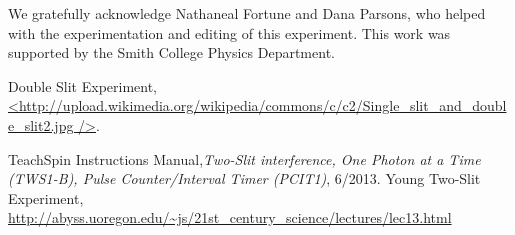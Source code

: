 \documentclass[prb,preprint]{revtex4-1}
\begin{document}
\begin{acknowledgments}

We gratefully acknowledge Nathaneal Fortune and Dana Parsons, who helped with the experimentation and editing of this experiment.  This work was supported by the Smith College Physics Department.

\end{acknowledgments}


\begin{thebibliography}{99}

 Double Slit Experiment, \url{<http://upload.wikimedia.org/wikipedia/commons/c/c2/Single_slit_and_double_slit2.jpg
/>}.

 TeachSpin Instructions Manual,\textit{Two-Slit interference, One Photon at a Time (TWS1-B), Pulse Counter/Interval Timer (PCIT1)}, 6/2013.
 Young Two-Slit Experiment, \url{http://abyss.uoregon.edu/~js/21st_century_science/lectures/lec13.html}

\end{thebibliography}

\end{document}
